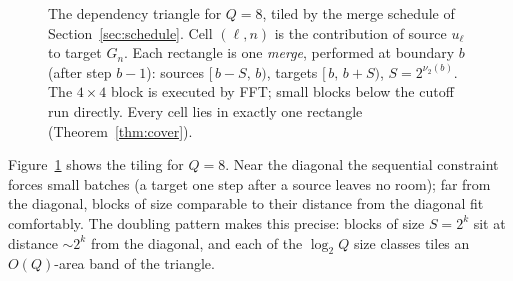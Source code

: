 \documentclass[11pt]{article}
\newcommand{\vtwo}{\nu_2}
\begin{document}
\begin{figure}[t]
\centering
{}
\caption{The dependency triangle for $Q=8$, tiled by the merge schedule
of Section~\ref{sec:schedule}. Cell $(\ell,n)$ is the contribution of
source $u_\ell$ to target $G_n$. Each rectangle is one \emph{merge},
performed at boundary $b$ (after step $b-1$): sources $[\,b-S,\,b)$,
targets $[\,b,\,b+S)$, $S=2^{\vtwo(b)}$. The $4{\times}4$ block is
executed by FFT; small blocks below the cutoff run directly. Every cell
lies in exactly one rectangle (Theorem~\ref{thm:cover}).}
\label{fig:triangle}
\end{figure}

Figure~\ref{fig:triangle} shows the tiling for $Q=8$. Near the diagonal
the sequential constraint forces small batches (a target one step after
a source leaves no room); far from the diagonal, blocks of size
comparable to their distance from the diagonal fit comfortably. The
doubling pattern makes this precise: blocks of size $S=2^k$ sit at
distance $\sim 2^k$ from the diagonal, and each of the $\log_2 Q$ size
classes tiles an $O(Q)$-area band of the triangle.
\end{document}
